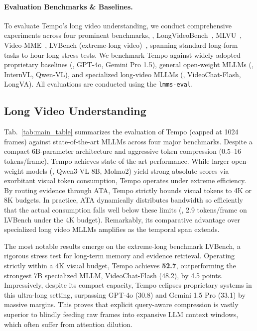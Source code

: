 \paragraph{\textbf{Evaluation Benchmarks \& Baselines.}}
To evaluate Tempo's long video understanding, we conduct comprehensive experiments across four prominent benchmarks, \ie, LongVideoBench~\cite{wu2024longvideobench}, MLVU~\cite{zhou2025mlvu}, Video-MME~\cite{fu2025video}, LVBench (extreme-long video)~\cite{wang2025lvbench}, spanning standard long-form tasks to hour-long stress tests. We benchmark Tempo against widely adopted proprietary baselines (\eg, GPT-4o, Gemini Pro 1.5), general open-weight MLLMs (\eg, InternVL, Qwen-VL), and specialized long-video MLLMs (\eg, VideoChat-Flash, LongVA). All evaluations are conducted using the \texttt{lmms-eval}.


\subsection{Long Video Understanding}
\label{sec:main_results}

Tab.~\ref{tab:main_table} summarizes the evaluation of Tempo (capped at 1024 frames) against state-of-the-art MLLMs across four major benchmarks. Despite a compact 6B-parameter architecture and aggressive token compression (0.5--16 tokens/frame), Tempo achieves state-of-the-art performance. While larger open-weight models (\eg, Qwen3-VL 8B, Molmo2) yield strong absolute scores via exorbitant visual token consumption, Tempo operates under extreme efficiency. By routing evidence through ATA, Tempo strictly bounds visual tokens to 4K or 8K budgets. In practice, ATA dynamically distributes bandwidth so efficiently that the actual consumption falls well below these limits (\eg, 2.9 tokens/frame on LVBench under the 4K budget). Remarkably, its comparative advantage over specialized long video MLLMs amplifies as the temporal span extends.

%
The most notable results emerge on the extreme-long benchmark LVBench, a rigorous stress test for long-term memory and evidence retrieval. Operating strictly within a 4K visual budget, Tempo achieves \textbf{52.7}, outperforming the strongest 7B specialized MLLM, VideoChat-Flash (48.2), by 4.5 points. Impressively, despite its compact capacity, Tempo eclipses proprietary systems in this ultra-long setting, surpassing GPT-4o (30.8) and Gemini 1.5 Pro (33.1) by massive margins.
% 
This proves that explicit query-aware compression is vastly superior to blindly feeding raw frames into expansive LLM context windows, which often suffer from attention dilution.

